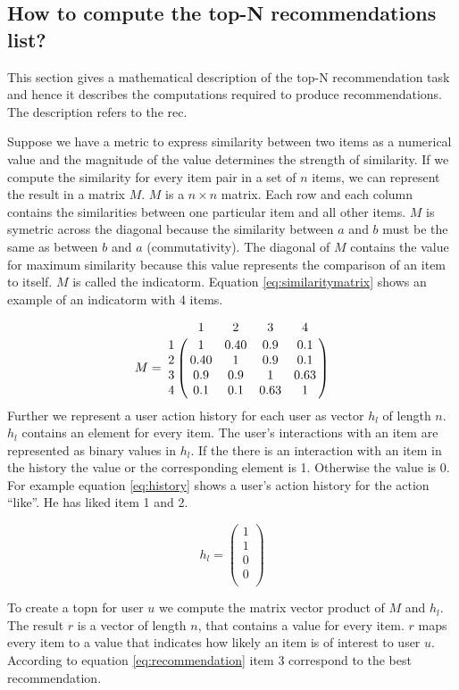 \subsection{How to compute the top-N recommendations list?}
\label{sec:problem}
This section gives a mathematical description of the top-N recommendation task and hence it describes the computations required to produce recommendations. The description refers to the \gls{rec}.

Suppose we have a metric to express similarity between two items as a numerical value and the magnitude of the value determines the strength of similarity. If we compute the similarity for every item pair in a set of $n$ items, we can represent the result in a matrix $M$. $M$ is a $n \times n$ matrix. Each row and each column contains the similarities between one particular item and all other items. $M$ is symetric across the diagonal because the similarity between $a$ and $b$ must be the same as between $b$ and $a$ (commutativity). The diagonal of $M$ contains the value for maximum similarity because this value represents the comparison of an item to itself. $M$ is called the \gls{indicatorm}. Equation \ref{eq:similaritymatrix} shows an example of an \gls{indicatorm} with 4 items.

\begin{equation}
  \label{eq:similaritymatrix}
M =\bordermatrix{~ & 1 & 2 & 3 & 4 \cr
 1 & 1  & 0.40 & 0.9 & 0.1 \cr
2 & 0.40 &1  & 0.9 & 0.1 \cr
 3& 0.9 & 0.9 &1  & 0.63 \cr
 4 & 0.1 & 0.1 & 0.63 &1  \cr}
\end{equation}
Further we represent a user action history for each user as vector $h_l$ of length $n$. $h_l$ contains an element for every item. The user's interactions with an item are represented as binary values in $h_l$. If the there is an interaction with an item in the history the value or the corresponding element is 1. Otherwise the value is 0. For example equation \ref{eq:history} shows a user's action history for the action ``like''. He has liked item 1 and 2.

\begin{equation}
\label{eq:history}
h_l =
\begin{pmatrix}
 1 \\
 1 \\
 0 \\
 0 \\
\end{pmatrix}
\end{equation}

To create a \gls{topn} for user $u$ we compute the matrix vector product of $M$ and $h_l$. The result $r$ is a vector of length $n$, that contains a value for every item. $r$ maps every item to a value that indicates how likely an item is of interest to user $u$. According to equation \ref{eq:recommendation} item 3 correspond to the best recommendation.


